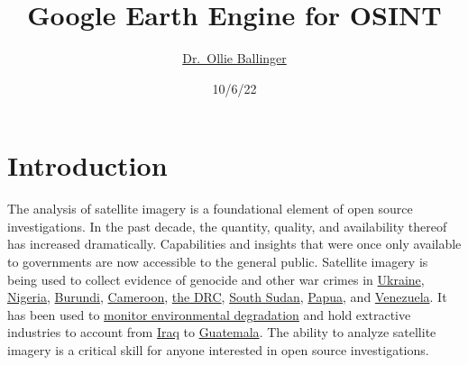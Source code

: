 \documentclass[
  letterpaper,
  DIV=11,
  numbers=noendperiod]{scrreprt}
\title{Google Earth Engine for OSINT}
\author{\href{https://oballinger.github.io}{Dr.~Ollie Ballinger}}
\date{10/6/22}
\renewcommand*\contentsname{Table of contents}
\newcommand\contentsname{Table of contents}
\begin{document}
\maketitle
\ifdefined\Shaded\renewenvironment{Shaded}{\begin{tcolorbox}[enhanced, boxrule=0pt, frame hidden, borderline west={3pt}{0pt}{shadecolor}, sharp corners, breakable, interior hidden]}{\end{tcolorbox}}\fi

\renewcommand*\contentsname{Table of contents}
{
\hypersetup{linkcolor=}
\setcounter{tocdepth}{2}
\tableofcontents
}

\hypertarget{introduction}{%
\chapter*{Introduction}\label{introduction}}


The analysis of satellite imagery is a foundational element of open
source investigations. In the past decade, the quantity, quality, and
availability thereof has increased dramatically. Capabilities and
insights that were once only available to governments are now accessible
to the general public. Satellite imagery is being used to collect
evidence of genocide and other war crimes in
\href{https://www.nbcnews.com/science/science-news/ukraine-satellites-war-crimes-rcna26291}{Ukraine},
\href{https://www.amnesty.org/en/latest/news/2016/04/nigeria-military-cover-up-of-mass-slaughter-at-zaria-exposed/}{Nigeria},
\href{https://www.amnesty.org/en/latest/news/2016/01/burundi-satellite-evidence-supports-witness-accounts-of-mass-graves/}{Burundi},
\href{https://www.amnesty.org/en/latest/news/2021/07/cameroon-satellite-images-reveal-devastation-in-anglophone-regions-2/}{Cameroon},
\href{https://www.aaas.org/resources/satellite-imagery-assessment-forced-relocations-near-luiswishi-mine}{the
DRC},
\href{https://gsp.yale.edu/case-studies/sudan/maps-satellite-images/other-darfur-satellite-imagery}{South
Sudan},
\href{https://gsp.yale.edu/resources/maps-satellite-images/papua}{Papua},
and
\href{https://www.hrw.org/report/2016/04/04/unchecked-power/police-and-military-raids-low-income-and-immigrant-communities}{Venezuela}.
It has been used to
\href{https://www.theguardian.com/environment/2016/mar/02/new-satellite-mapping-a-game-changer-against-illegal-logging}{monitor
environmental degradation} and hold extractive industries to account
from
\href{https://www.bellingcat.com/resources/2021/04/15/what-oil-satellite-technology-and-iraq-can-tell-us-about-pollution/}{Iraq}
to
\href{https://www.planet.com/pulse/the-observatory-of-extractive-industries-oie-shines-a-light-on-the-mining-industry-using-planets-satellite-data/}{Guatemala}.
The ability to analyze satellite imagery is a critical skill for anyone
interested in open source investigations.
\end{document}
